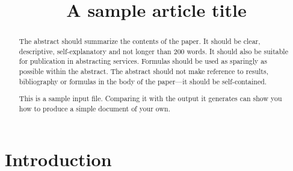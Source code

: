 \documentclass[aoas,preprint]{imsart}
\theoremstyle{remark}
\begin{document}
\begin{frontmatter}
\title{A sample article title}


\begin{abstract}
The abstract should summarize the contents of the paper.
It should be clear, descriptive, self-explanatory and not longer
than 200 words. It should also be suitable for publication in
abstracting services. Formulas should be used as sparingly as
possible within the abstract. The abstract should not make
reference to results, bibliography or formulas in the body
of the paper---it should be self-contained.

This is a sample input file.  Comparing it with the output it
generates can show you how to produce a simple document of
your own.
\end{abstract}

\begin{keyword}
\end{keyword}

\end{frontmatter}

\section{Introduction}
\end{document}
